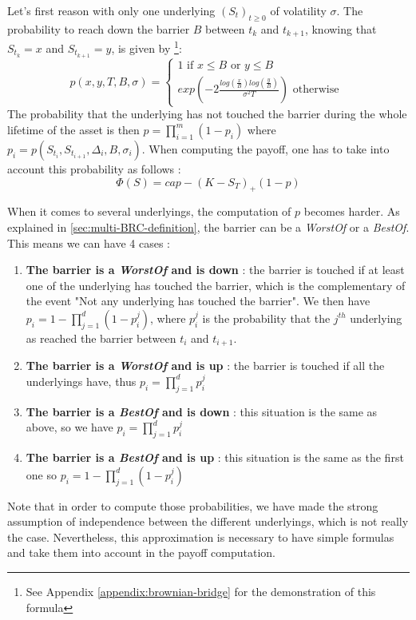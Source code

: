 \documentclass[a4paper,11pt,english]{book}
\begin{document}
Let's first reason with only one underlying $(S_{t})_{t\geq0}$ of volatility $\sigma$. The probability to reach down the barrier $B$ between $t_{k}$ and $t_{k+1}$, knowing that $S_{t_{k}}=x$ and $S_{t_{k+1}}=y$, is given by \footnote{See Appendix \ref{appendix:brownian-bridge} for the demonstration of this formula}:
$$p(x,y,T,B,\sigma) = \left\{
    \begin{array}{ll}
        1 \text{ if } x\leq B \text{ or } y\leq B \\
        exp(-2\frac{log(\frac{x}{B})log(\frac{y}{B})}{\sigma^{2}T}) \text{ otherwise }
    \end{array}
\right.$$
The probability that the underlying has not touched the barrier during the whole lifetime of the asset is then $p=\prod_{i=1}^{m}(1-p_{i})$ where $p_{i}=p(S_{t_{i}},S_{t_{i+1}},\Delta_{i},B,\sigma_{i})$. When computing the payoff, one has to take into account this probability as follows :
$$\Phi(S) = cap -(K-S_{T})_{+}(1-p)$$

When it comes to several underlyings, the computation of $p$ becomes harder. As explained in \ref{sec:multi-BRC-definition}, the barrier can be a \textit{WorstOf} or a \textit{BestOf}. This means we can have 4 cases :
\begin{enumerate}
    \item \textbf{The barrier is a \textit{WorstOf} and is down} : the barrier is touched if at least one of the underlying has touched the barrier, which is the complementary of the event "Not any underlying has touched the barrier". We then have $p_{i}=1-\prod_{j=1}^{d}(1-p_{i}^{j})$, where $p_{i}^{j}$ is the probability that the $j^{th}$ underlying as reached the barrier between $t_{i}$ and $t_{i+1}$.
    
    \item \textbf{The barrier is a \textit{WorstOf} and is up} : the barrier is touched if all the underlyings have, thus $p_{i}=\prod_{j=1}^{d}p_{i}^{j}$
    
    \item \textbf{The barrier is a \textit{BestOf} and is down} : this situation is the same as above, so we have $p_{i}=\prod_{j=1}^{d}p_{i}^{j}$
    
    \item \textbf{The barrier is a \textit{BestOf} and is up} : this situation is the same as the first one so  $p_{i}=1-\prod_{j=1}^{d}(1-p_{i}^{j})$
\end{enumerate}
Note that in order to compute those probabilities, we have made the strong assumption of independence between the different underlyings, which is not really the case. Nevertheless, this approximation is necessary to have simple formulas and take them into account in the payoff computation.
\end{document}

